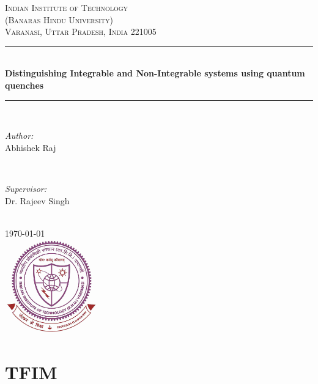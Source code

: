 \documentclass[a4paper]{article}
\begin{document}
\begin{titlepage}
\newcommand{\HRule}{\rule{\linewidth}{0.5mm}} 

\center
 

\textsc{\LARGE Indian Institute of Technology}\\[1.5cm]
\textsc{\Large (Banaras Hindu University)}\\[0.5cm] 
\textsc{\large Varanasi, Uttar Pradesh, India 221005}\\[0.5cm] 


\HRule \\[0.4cm]
{ \huge \bfseries Distinguishing Integrable and Non-Integrable systems using quantum quenches}\\[0.4cm] 
\HRule \\[1.5cm]


\begin{minipage}{0.4\textwidth}
\begin{flushleft} \large
\emph{Author:}\\
 Abhishek Raj\textsc{}
\end{flushleft}
\end{minipage}
~
\begin{minipage}{0.4\textwidth}
\begin{flushright} \large
\emph{Supervisor:} \\
Dr. Rajeev Singh
\end{flushright}
\end{minipage}\\[2cm]

{\today}\\[2cm]

\includegraphics[width=0.3\textwidth]{logo.png}\\[1cm] 
\vfill

\end{titlepage}


\tableofcontents
\newpage
\listoffigures

\newpage
\section{TFIM}
\end{document}

